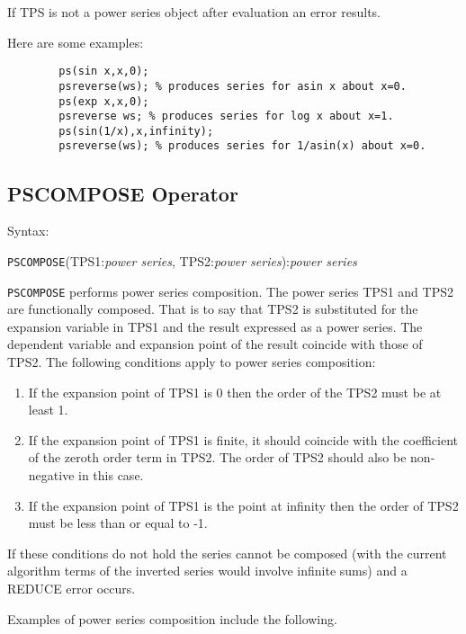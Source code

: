 If TPS is not a power series object after evaluation an error results.

\noindent Here are some examples:
\begin{verbatim}
        ps(sin x,x,0);
        psreverse(ws); % produces series for asin x about x=0.
        ps(exp x,x,0);
        psreverse ws; % produces series for log x about x=1.
        ps(sin(1/x),x,infinity);
        psreverse(ws); % produces series for 1/asin(x) about x=0.
\end{verbatim}

\subsection{PSCOMPOSE Operator}

Syntax:

\hspace*{2em} {\tt PSCOMPOSE}(TPS1:{\em power series},
TPS2:{\em power series}):{\em power series}

{\tt PSCOMPOSE} performs power series composition.
The power series TPS1 and TPS2 are functionally composed.
That is to say that TPS2 is substituted for the expansion
variable in TPS1 and the result expressed as a power series. The
dependent variable and expansion point of the result coincide with
those of TPS2.  The following conditions apply to power series
composition:

\begin{enumerate}
\item If the expansion point of TPS1 is 0 then the order of the
TPS2 must be at least 1.

\item If the expansion point of TPS1 is finite, it should
coincide with the coefficient of the zeroth order term in TPS2.
The order of TPS2 should also be non-negative in this case.

\item If the expansion point of TPS1 is the point at infinity
then the order of TPS2 must be less than or equal to -1.

\end{enumerate}

If these conditions do not hold the series cannot be composed (with
the current algorithm terms of the inverted series would involve
infinite sums) and a REDUCE error occurs.

\noindent Examples of power series composition include the following.

